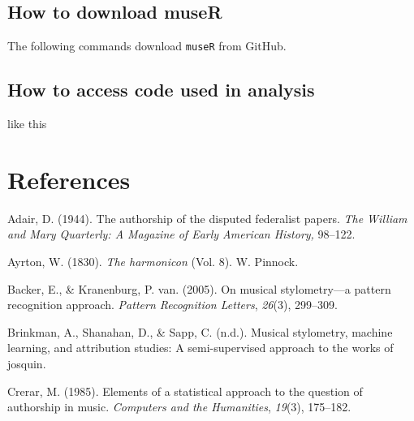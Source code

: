 \documentclass[12pt,twoside]{reedthesis}
\theoremstyle{definition}
\theoremstyle{definition}
\theoremstyle{definition}
\theoremstyle{remark}
\begin{document}
\section*{How to download museR}\label{how-to-download-muser}

The following commands download \texttt{museR} from GitHub.
\begin{Shaded}
\begin{Highlighting}[]
\NormalTok{(}\NormalTok{)}
\end{Highlighting}
\end{Shaded}
\section*{How to access code used in
analysis}\label{how-to-access-code-used-in-analysis}

like this

\backmatter

\chapter*{References}\label{references}


\noindent

\setlength{\parindent}{-0.20in} \setlength{\leftskip}{0.20in}
\setlength{\parskip}{8pt}

\hypertarget{refs}{}
\hypertarget{ref-adair1944}{}
Adair, D. (1944). The authorship of the disputed federalist papers.
\emph{The William and Mary Quarterly: A Magazine of Early American
History,} 98--122.

\hypertarget{ref-harmonicon}{}
Ayrton, W. (1830). \emph{The harmonicon} (Vol. 8). W. Pinnock.

\hypertarget{ref-backer2005}{}
Backer, E., \& Kranenburg, P. van. (2005). On musical stylometry---a
pattern recognition approach. \emph{Pattern Recognition Letters},
\emph{26}(3), 299--309.

\hypertarget{ref-brinkman2016}{}
Brinkman, A., Shanahan, D., \& Sapp, C. (n.d.). Musical stylometry,
machine learning, and attribution studies: A semi-supervised approach to
the works of josquin.

\hypertarget{ref-crerar}{}
Crerar, M. (1985). Elements of a statistical approach to the question of
authorship in music. \emph{Computers and the Humanities}, \emph{19}(3),
175--182.
\end{document}
